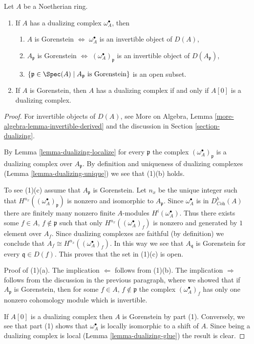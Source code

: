 \begin{lemma}
\label{lemma-gorenstein}
Let $A$ be a Noetherian ring.
\begin{enumerate}
\item If $A$ has a dualizing complex $\omega_A^\bullet$, then
\begin{enumerate}
\item $A$ is Gorenstein $\Leftrightarrow$ $\omega_A^\bullet$ is an invertible
object of $D(A)$,
\item $A_\mathfrak p$ is Gorenstein $\Leftrightarrow$
$(\omega_A^\bullet)_\mathfrak p$ is an invertible object of
$D(A_\mathfrak p)$,
\item $\{\mathfrak p \in \Spec(A) \mid A_\mathfrak p\text{ is Gorenstein}\}$
is an open subset.
\end{enumerate}
\item If $A$ is Gorenstein, then $A$ has a dualizing complex if and
only if $A[0]$ is a dualizing complex.
\end{enumerate}
\end{lemma}

\begin{proof}
For invertible objects of $D(A)$, see
More on Algebra, Lemma \ref{more-algebra-lemma-invertible-derived}
and the discussion in Section \ref{section-dualizing}.

\medskip\noindent
By Lemma \ref{lemma-dualizing-localize} for every
$\mathfrak p$ the complex $(\omega_A^\bullet)_\mathfrak p$ is a
dualizing complex over $A_\mathfrak p$. By definition and uniqueness
of dualizing complexes (Lemma \ref{lemma-dualizing-unique})
we see that (1)(b) holds.

\medskip\noindent
To see (1)(c) assume that $A_\mathfrak p$ is Gorenstein.
Let $n_x$ be the unique integer such that
$H^{n_{x}}((\omega_A^\bullet)_\mathfrak p)$
is nonzero and isomorphic to $A_\mathfrak p$.
Since $\omega_A^\bullet$ is in $D^b_{\textit{Coh}}(A)$
there are finitely many nonzero finite $A$-modules
$H^i(\omega_A^\bullet)$. Thus there exists some
$f \in A$, $f \not \in \mathfrak p$
such that only $H^{n_x}((\omega_A^\bullet)_f)$
is nonzero and generated by $1$ element over $A_f$.
Since dualizing complexes are faithful (by definition)
we conclude that $A_f \cong H^{n_x}((\omega_A^\bullet)_f)$.
In this way we see that $A_\mathfrak q$ is Gorenstein
for every $\mathfrak q \in D(f)$. This proves that the set
in (1)(c) is open.

\medskip\noindent
Proof of (1)(a). The implication $\Leftarrow$ follows from (1)(b).
The implication $\Rightarrow$ follows from the discussion
in the previous paragraph, where we showed that if $A_\mathfrak p$
is Gorenstein, then for some $f \in A$, $f \not \in \mathfrak p$
the complex $(\omega_A^\bullet)_f$ has only one nonzero cohomology module
which is invertible.

\medskip\noindent
If $A[0]$ is a dualizing complex then $A$ is Gorenstein by
part (1). Conversely, we see that part (1) shows that
$\omega_A^\bullet$ is locally isomorphic to a shift of $A$.
Since being a dualizing complex is local
(Lemma \ref{lemma-dualizing-glue})
the result is clear.
\end{proof}

